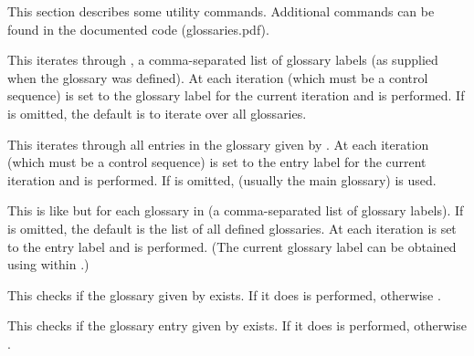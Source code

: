 \documentclass[report]{nlctdoc}
\begin{document}
This section describes some utility commands. Additional commands
can be found in the documented code (glossaries.pdf).

\begin{definition}[\DescribeMacro{\forallglossaries}]
\end{definition}
This iterates through , a comma-separated list
of glossary labels (as supplied when the glossary was defined).
At each iteration  (which must be a control sequence) is
set to the glossary label for the current iteration and 
is performed. If  is omitted, the default is to
iterate over all glossaries.

\begin{definition}[\DescribeMacro{\forglsentries}]
\end{definition}
This iterates through all entries in the glossary given by
. At each iteration  (which must be a
control sequence) is set to the entry label for the current
iteration and  is performed. If  is
omitted,  (usually the main glossary) is used.

\begin{definition}[\DescribeMacro{\forallglsentries}]
\end{definition}
This is like  but for each glossary in
 (a comma-separated list of glossary labels). If
 is omitted, the default is the list of all
defined glossaries. At each iteration  is set to the entry
label and  is performed. (The current glossary label can
be obtained using  within .)

\begin{definition}[\DescribeMacro{\ifglossaryexists}]
\end{definition}
This checks if the glossary given by  exists. If it
does  is performed, otherwise .

\begin{definition}[\DescribeMacro{\ifglsentryexists}]
\end{definition}
This checks if the glossary entry given by  exists. If it
does  is performed, otherwise .
\end{document}
